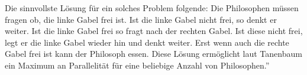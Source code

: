 Die sinnvollste Lösung für ein solches Problem folgende: Die Philosophen müssen fragen ob, die linke Gabel frei ist. Ist die linke Gabel nicht frei, so denkt er weiter. Ist die linke Gabel frei so fragt nach der rechten Gabel. Ist diese nicht frei, legt er die linke Gabel wieder hin und denkt weiter. Erst wenn auch die rechte Gabel frei ist kann der Philosoph essen. Diese Lösung ermöglicht laut Tanenbaum \glqq ein Maximum an Parallelität für eine beliebige Anzahl von Philosophen.''\parencite[S.222]{tanenbaum2016}
















